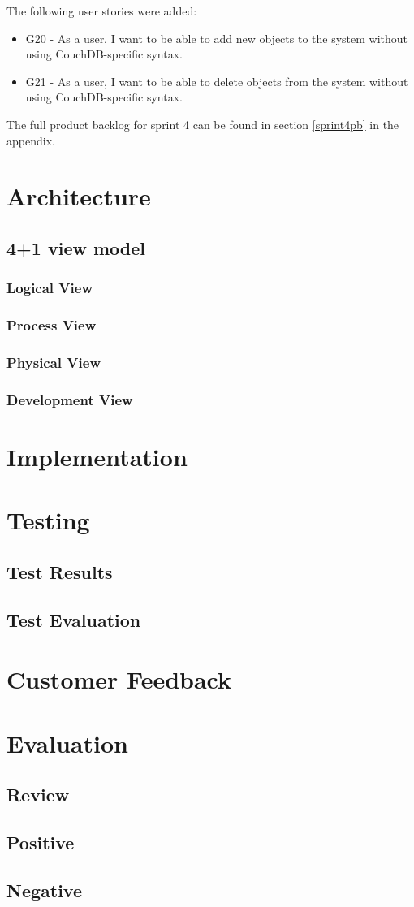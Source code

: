 The following user stories were added:

\begin{itemize}
\item G20 - As a user, I want to be able to add new objects to the system without using CouchDB-specific syntax.
\item G21 - As a user, I want to be able to delete objects from the system without using CouchDB-specific syntax.
\end{itemize}

The full product backlog for sprint 4 can be found in section \ref{sprint4pb} in the appendix.

\section{Architecture}
\subsection{4+1 view model}
\subsubsection{Logical View}
\subsubsection{Process View}
\subsubsection{Physical View}
\subsubsection{Development View}

\section{Implementation}

\section{Testing}
\subsection{Test Results}
\subsection{Test Evaluation}

\section{Customer Feedback}

\section{Evaluation}
\subsection{Review}
\subsection{Positive}
\subsection{Negative}
